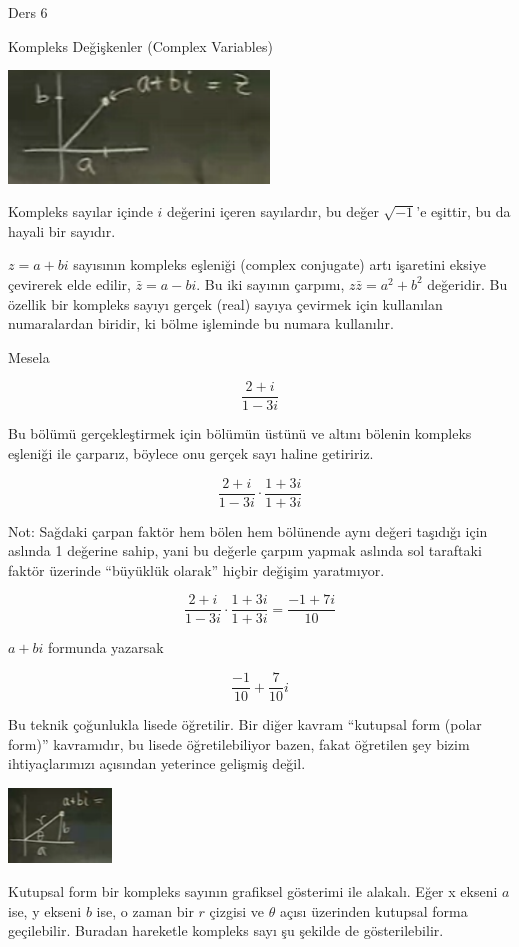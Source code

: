\documentclass[12pt,fleqn]{article}\usepackage{../../common}
\begin{document}
Ders 6

Kompleks Değişkenler (Complex Variables)

\includegraphics[height=3cm]{6_1.png}

Kompleks sayılar içinde $i$ değerini içeren sayılardır, bu değer
$\sqrt{-1}$'e eşittir, bu da hayali bir sayıdır. 

$z=a+bi$ sayısının kompleks eşleniği (complex conjugate) artı
işaretini eksiye çevirerek elde edilir, $\bar{z}=a-bi$. Bu iki sayının
çarpımı, $z\bar{z} = a^2+b^2$ değeridir. Bu özellik bir kompleks sayıyı
gerçek (real) sayıya çevirmek için kullanılan numaralardan biridir, ki
bölme işleminde bu numara kullanılır.

Mesela

$$ \frac{2+i}{1-3i} $$

Bu bölümü gerçekleştirmek için bölümün üstünü ve altını bölenin kompleks
eşleniği ile çarparız, böylece onu gerçek sayı haline getiririz.

$$ \frac{2+i}{1-3i} \cdot \frac{1+3i}{1+3i}$$

Not: Sağdaki çarpan faktör hem bölen hem bölünende aynı değeri taşıdığı
için aslında 1 değerine sahip, yani bu değerle çarpım yapmak aslında sol
taraftaki faktör üzerinde ``büyüklük olarak'' hiçbir değişim yaratmıyor.

$$ \frac{2+i}{1-3i} \cdot \frac{1+3i}{1+3i} = \frac{-1+7i}{10}$$


$a+bi$ formunda yazarsak

$$ \frac{-1}{10} + \frac{7}{10}i $$

Bu teknik çoğunlukla lisede öğretilir. Bir diğer kavram ``kutupsal form
(polar form)'' kavramıdır, bu lisede öğretilebiliyor bazen, fakat öğretilen
şey bizim ihtiyaçlarımızı açısından yeterince gelişmiş değil. 

\includegraphics[height=2cm]{6_2.png}

Kutupsal form bir kompleks sayının grafiksel gösterimi ile alakalı. Eğer x
ekseni $a$ ise, y ekseni $b$ ise, o zaman bir $r$ çizgisi ve $\theta$ açısı
üzerinden kutupsal forma geçilebilir. Buradan hareketle kompleks sayı şu
şekilde de gösterilebilir. 
\end{document}
